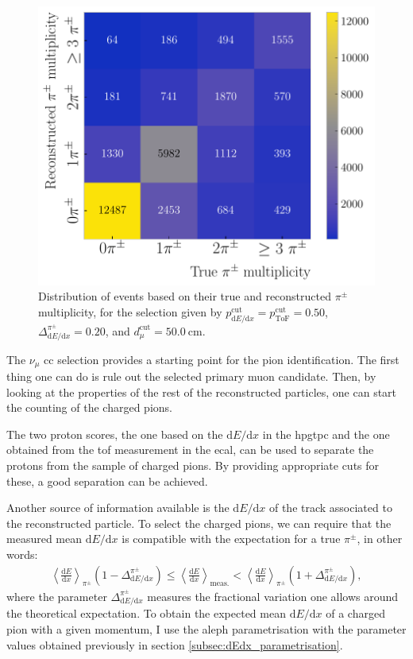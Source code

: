 \begin{figure}[t]
    \centering
    \includegraphics[width=.75\linewidth]{Images/GAr_selection/pion_selection_confusion_matrix.pdf}
    \caption[Distribution of events based on their true and reconstructed $\pi^{\pm}$ multiplicity, for a given selection.]{Distribution of events based on their true and reconstructed $\pi^{\pm}$ multiplicity, for the selection given by $p^{\mathrm{cut}}_{\mathrm{d}E/\mathrm{d}x} = p^{\mathrm{cut}}_{\mathrm{ToF}} = 0.50$, $\Delta^{\pi^{\pm}}_{\mathrm{d}E/\mathrm{d}x} = 0.20$, and $d^{\mathrm{cut}}_{\mu} = 50.0~\mathrm{cm}$.}
    \label{fig:pion_multiplicity_example}
\end{figure}

The $\nu_{\mu}$ \gls{cc} selection provides a starting point for the pion identification. The first thing one can do is rule out the selected primary muon candidate. Then, by looking at the properties of the rest of the reconstructed particles, one can start the counting of the charged pions.

The two proton scores, the one based on the $\mathrm{d}E/\mathrm{d}x$ in the \gls{hpgtpc} and the one obtained from the \gls{tof} measurement in the \gls{ecal}, can be used to separate the protons from the sample of charged pions. By providing appropriate cuts for these, a good separation can be achieved.

Another source of information available is the $\mathrm{d}E/\mathrm{d}x$ of the track associated to the reconstructed particle. To select the charged pions, we can require that the measured mean $\mathrm{d}E/\mathrm{d}x$ is compatible with the expectation for a true $\pi^{\pm}$, in other words:
\begin{eqnarray}
    \left<\frac{\mathrm{d}E}{\mathrm{d}x}\right>_{\pi^{\pm}} \left(1 - \Delta_{\mathrm{d}E/\mathrm{d}x}^{\pi^{\pm}}\right) \leq \left<\frac{\mathrm{d}E}{\mathrm{d}x}\right>_{\mathrm{meas.}} < \left<\frac{\mathrm{d}E}{\mathrm{d}x}\right>_{\pi^{\pm}} \left(1 + \Delta_{\mathrm{d}E/\mathrm{d}x}^{\pi^{\pm}}\right),
\end{eqnarray}
where the parameter $\Delta_{\mathrm{d}E/\mathrm{d}x}^{\pi^{\pm}}$ measures the fractional variation one allows around the theoretical expectation. To obtain the expected mean $\mathrm{d}E/\mathrm{d}x$ of a charged pion with a given momentum, I use the \gls{aleph} parametrisation with the parameter values obtained previously in section \ref{subsec:dEdx_parametrisation}.

